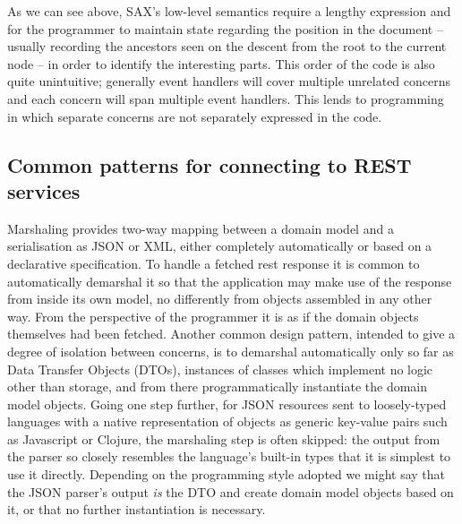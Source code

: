 \documentclass[]{article}
\begin{document}
As we can see above, SAX's low-level semantics require a lengthy
expression and for the programmer to maintain state regarding the
position in the document -- usually recording the ancestors seen on the
descent from the root to the current node -- in order to identify the
interesting parts. This order of the code is also quite unintuitive;
generally event handlers will cover multiple unrelated concerns and each
concern will span multiple event handlers. This lends to programming in
which separate concerns are not separately expressed in the code.

\subsection{Common patterns for connecting to REST services}

Marshaling provides two-way mapping between a domain model and a
serialisation as JSON or XML, either completely automatically or based
on a declarative specification. To handle a fetched rest response it is
common to automatically demarshal it so that the application may make
use of the response from inside its own model, no differently from
objects assembled in any other way. From the perspective of the
programmer it is as if the domain objects themselves had been fetched.
Another common design pattern, intended to give a degree of isolation
between concerns, is to demarshal automatically only so far as Data
Transfer Objects (DTOs), instances of classes which implement no logic
other than storage, and from there programmatically instantiate the
domain model objects. Going one step further, for JSON resources sent to
loosely-typed languages with a native representation of objects as
generic key-value pairs such as Javascript or Clojure, the marshaling
step is often skipped: the output from the parser so closely resembles
the language's built-in types that it is simplest to use it directly.
Depending on the programming style adopted we might say that the JSON
parser's output \emph{is} the DTO and create domain model objects based
on it, or that no further instantiation is necessary.
\end{document}
